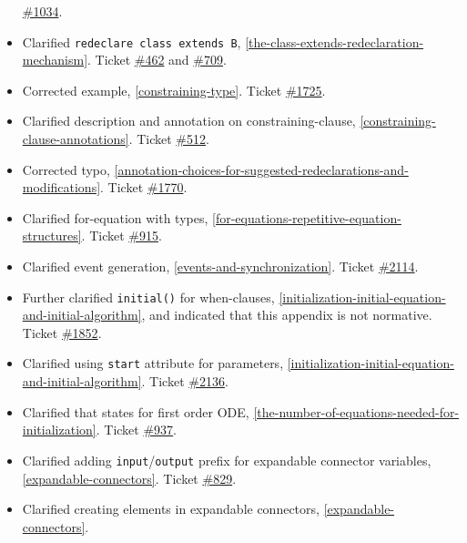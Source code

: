 \begin{itemize}
  \href{https://github.com/modelica/ModelicaSpecification/issues/1034}{\#1034}.
\item
  Clarified \lstinline!redeclare class extends B!, \cref{the-class-extends-redeclaration-mechanism}. Ticket
  \href{https://github.com/modelica/ModelicaSpecification/issues/462}{\#462} and
  \href{https://github.com/modelica/ModelicaSpecification/issues/709}{\#709}.
\item
  Corrected example, \cref{constraining-type}. Ticket
  \href{https://github.com/modelica/ModelicaSpecification/issues/1725}{\#1725}.
\item
  Clarified description and annotation on constraining-clause, \cref{constraining-clause-annotations}. Ticket
  \href{https://github.com/modelica/ModelicaSpecification/issues/512}{\#512}.
\item
  Corrected typo, \cref{annotation-choices-for-suggested-redeclarations-and-modifications}. Ticket
  \href{https://github.com/modelica/ModelicaSpecification/issues/1770}{\#1770}.
\item
  Clarified for-equation with types, \cref{for-equations-repetitive-equation-structures}. Ticket
  \href{https://github.com/modelica/ModelicaSpecification/issues/915}{\#915}.
\item
  Clarified event generation, \cref{events-and-synchronization}. Ticket
  \href{https://github.com/modelica/ModelicaSpecification/issues/2114}{\#2114}.
\item
  Further clarified \lstinline!initial()! for when-clauses, \cref{initialization-initial-equation-and-initial-algorithm}, and indicated that this appendix is not normative.
  Ticket \href{https://github.com/modelica/ModelicaSpecification/issues/1852}{\#1852}.
\item
  Clarified using \lstinline!start! attribute for parameters, \cref{initialization-initial-equation-and-initial-algorithm}. Ticket
  \href{https://github.com/modelica/ModelicaSpecification/issues/2136}{\#2136}.
\item
  Clarified that states for first order ODE, \cref{the-number-of-equations-needed-for-initialization}. Ticket
  \href{https://github.com/modelica/ModelicaSpecification/issues/937}{\#937}.
\item
  Clarified adding \lstinline!input!/\lstinline!output! prefix for expandable connector variables, \cref{expandable-connectors}.
  Ticket \href{https://github.com/modelica/ModelicaSpecification/issues/829}{\#829}.
\item
  Clarified creating elements in expandable connectors, \cref{expandable-connectors}.

\end{itemize}
